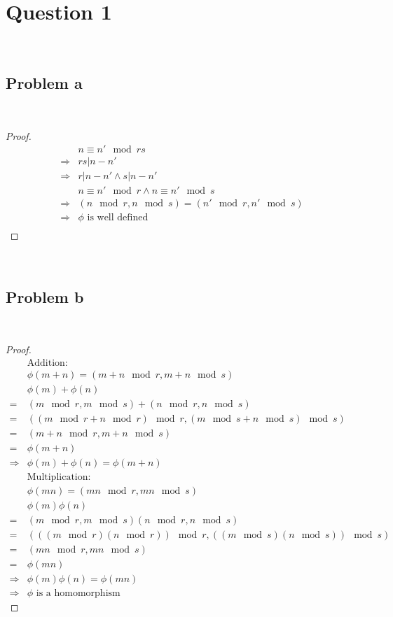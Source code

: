 \documentclass{article}
\begin{document}
\section*{Question 1}

~

\subsection*{Problem a}

~

\begin{proof}
    \begin{align*}
        &n\equiv n'\mod rs\\
        \Rightarrow&rs|n-n'\\
        \Rightarrow&r|n-n'\land s|n-n'\\
        &n\equiv n'\mod r\land n\equiv n'\mod s\\
        \Rightarrow&(n\mod r,n\mod s)=(n'\mod r,n'\mod s)\\
        \Rightarrow&\phi\text{ is well defined}\\
    \end{align*}
\end{proof}

~

\subsection*{Problem b}

~

\begin{proof}
    \begin{align*}
        &\text{Addition}:\\
        &\phi(m+n)=(m+n\mod r,m+n\mod s)\\
        &\phi(m)+\phi(n)\\
        =&(m\mod r,m\mod s)+(n\mod r,n\mod s)\\
        =&((m\mod r+n\mod r)\mod r,(m\mod s+n\mod s)\mod s)\\
        =&(m+n\mod r,m+n\mod s)\\
        =&\phi(m+n)\\
        \Rightarrow&\phi(m)+\phi(n)=\phi(m+n)\\
        &\text{Multiplication}:\\
        &\phi(mn)=(mn\mod r,mn\mod s)\\
        &\phi(m)\phi(n)\\
        =&(m\mod r,m\mod s)(n\mod r,n\mod s)\\
        =&(((m\mod r)(n\mod r))\mod r,((m\mod s)(n\mod s))\mod s)\\
        =&(mn\mod r,mn\mod s)\\
        =&\phi(mn)\\
        \Rightarrow&\phi(m)\phi(n)=\phi(mn)\\
        \Rightarrow&\phi\text{ is a homomorphism}
    \end{align*}
\end{proof}
\end{document}
